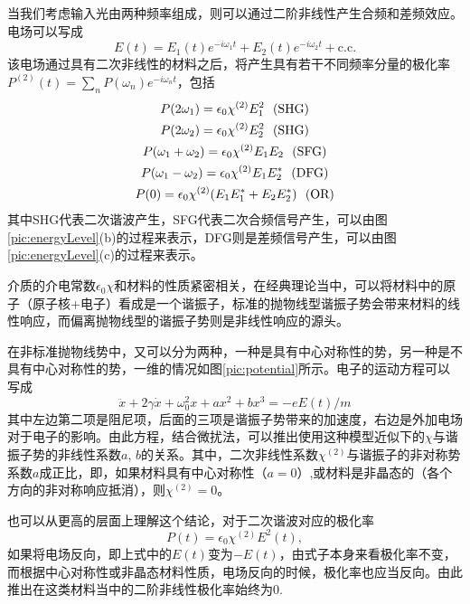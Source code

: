 \documentclass[UTF8,a4paper,cs4size,hyperref]{ctexart}
\begin{document}
当我们考虑输入光由两种频率组成，则可以通过二阶非线性产生合频和差频效应。电场可以写成
\begin{equation}
E(t) = E_1(t)e^{-i\omega_1 t}+E_2(t)e^{-i\omega_2 t}+\textrm{c.c.}
\end{equation}
该电场通过具有二次非线性的材料之后，将产生具有若干不同频率分量的极化率$P^{(2)}(t) = \sum_n P(\omega_n)e^{-i\omega_nt}$，包括
\begin{gather}
P(2\omega_1) = \epsilon_0\chi^{(2)}E_1^2 \ \ \textrm{(SHG)} \notag \\
P(2\omega_2) = \epsilon_0\chi^{(2)}E_2^2\ \  \textrm{(SHG)} \notag \\
P(\omega_1+\omega_2) = \epsilon_0\chi^{(2)}E_1E_2\ \  \textrm{(SFG)}  \\
P(\omega_1-\omega_2) = \epsilon_0\chi^{(2)}E_1E_2^*\ \  \textrm{(DFG)} \notag \\
P(0) = \epsilon_0\chi^{(2)}(E_1E_1^*+E_2E_2^*)\ \  \textrm{(OR)} \notag 
\end{gather}
其中SHG代表二次谐波产生，SFG代表二次合频信号产生，可以由图\ref{pic:energyLevel}(b)的过程来表示，DFG则是差频信号产生，可以由图\ref{pic:energyLevel}(c)的过程来表示。

介质的介电常数$\epsilon_0\chi$和材料的性质紧密相关，在经典理论当中，可以将材料中的原子（原子核+电子）看成是一个谐振子，标准的抛物线型谐振子势会带来材料的线性响应，而偏离抛物线型的谐振子势则是非线性响应的源头。

在非标准抛物线势中，又可以分为两种，一种是具有中心对称性的势，另一种是不具有中心对称性的势，一维的情况如图\ref{pic:potential}所示。电子的运动方程可以写成
\begin{equation}
\ddot{x}+2\gamma\dot{x}+\omega_0^2x+ax^2+bx^3 = -eE(t)/m
\end{equation}
其中左边第二项是阻尼项，后面的三项是谐振子势带来的加速度，右边是外加电场对于电子的影响。由此方程，结合微扰法，可以推出使用这种模型近似下的$\chi$与谐振子势的非线性系数$a$, $b$的关系\cite{boyd2003nonlinear}。其中，二次非线性系数$\chi^{(2)}$与谐振子的非对称势系数$a$成正比，即，如果材料具有中心对称性（$a=0$）,或材料是非晶态的（各个方向的非对称响应抵消），则$\chi^{(2)}=0$。

也可以从更高的层面上理解这个结论，对于二次谐波对应的极化率
\begin{equation}
P(t) = \epsilon_0\chi^{(2)}E^2(t),
\end{equation}
如果将电场反向，即上式中的$E(t)$变为$-E(t)$，由式子本身来看极化率不变，而根据中心对称性或非晶态材料性质，电场反向的时候，极化率也应当反向。由此推出在这类材料当中的二阶非线性极化率始终为0.
\end{document}

